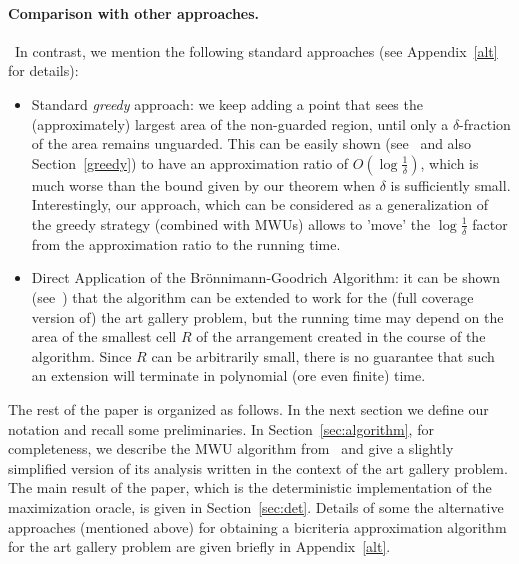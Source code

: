 \documentclass[a4paper,11pt]{article}
\def \OPT {\textsc{Opt}}
\begin{document}
\medskip

\paragraph{Comparison with other approaches.}~In contrast, we mention the following standard approaches (see Appendix~\ref{alt} for details):

\begin{itemize}
	\item Standard {\it greedy} approach: we keep adding a point that sees the (approximately) largest area of the non-guarded region, until only a $\delta$-fraction of the area remains unguarded. This can be easily shown (see~\cite{CEH07} and also Section~\ref{greedy}) to have an approximation ratio of $O(\log\frac1\delta)$, which is much worse than the bound given by our theorem when $\delta $ is sufficiently small. Interestingly, our approach, which can be considered as a generalization of the greedy strategy (combined with MWUs) allows to 'move' the $\log\frac1\delta$ factor from the approximation ratio to the running time.

\item Direct Application of the Br\"{o}nnimann-Goodrich Algorithm\cite{BG95}: it can be shown (see~\cite{E16}) that the algorithm can be extended to work for the (full coverage version of) the art gallery problem, but the running time may depend on the area of the smallest cell $R$ of the arrangement created in the course of the algorithm. Since $R$ can be arbitrarily small, there is no guarantee that such an extension will terminate in polynomial (ore even finite) time.    
\end{itemize}
 
\medskip
 
The rest of the paper is organized as follows. In the next section we define our notation and recall some preliminaries. In Section~\ref{sec:algorithm},  for completeness,  we describe the MWU algorithm from~\cite{E23} and give a slightly simplified version of its analysis written in the context of the art gallery problem. The main result of the paper, which is the deterministic implementation of the maximization oracle, is given in Section~\ref{sec:det}. Details of some the alternative approaches (mentioned above) for obtaining a bicriteria approximation algorithm for the art gallery problem are  given briefly in Appendix~\ref{alt}.         
\end{document}
